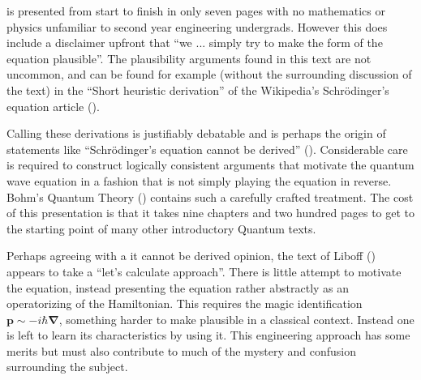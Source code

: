 \documentclass[]{eliblog}
\newcommand{\Bp}[0]{\mathbf{p}}
\newcommand{\spacegrad}[0]{\boldsymbol{\nabla}}
\begin{document}
is presented from start to finish in only seven pages with no mathematics or physics unfamiliar to second year engineering undergrads.  However this does include a disclaimer upfront that ``we ... simply try to make the form of the equation plausible''.  The plausibility arguments found in this text are not uncommon, and can be found for example (without the surrounding discussion of the text) in the ``Short heuristic derivation'' of the Wikipedia's Schr\"{o}dinger's equation article (\cite{wikiSchH}).

Calling these derivations is justifiably debatable and is perhaps the origin of statements like ``Schr\"{o}dinger's equation cannot be derived'' (\cite{hyperphysicsSch}).
Considerable care is required to construct logically consistent arguments that motivate the quantum wave equation in a fashion that is not simply playing the equation in reverse.  Bohm's Quantum Theory (\cite{bohm1989qt}) contains such a carefully crafted treatment.  The cost of this presentation is that it takes nine chapters and two hundred pages to get to the starting point of many other introductory Quantum texts.

Perhaps agreeing with a it cannot be derived opinion, the text of Liboff (\cite{liboff2003iqm}) appears to take a ``let's calculate approach''.  There is little attempt to motivate the equation, instead presenting the equation rather abstractly as an operatorizing of the Hamiltonian.  This requires the magic identification $\Bp \sim -i \hbar \spacegrad$, something harder to make plausible in a classical context.
Instead one is left to learn its characteristics by using it.  This engineering approach has some merits but must also contribute to much of the mystery and confusion surrounding the subject.




\end{document}
